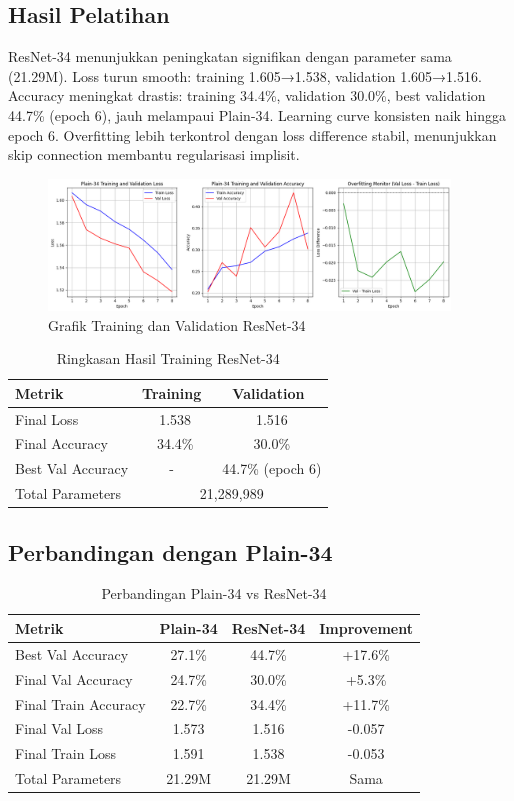 \documentclass[11pt,a4paper]{article}
\begin{document}
\subsection{Hasil Pelatihan}
ResNet-34 menunjukkan peningkatan signifikan dengan parameter sama (21.29M). Loss turun smooth: training 1.605→1.538, validation 1.605→1.516. Accuracy meningkat drastis: training 34.4\%, validation 30.0\%, best validation 44.7\% (epoch 6), jauh melampaui Plain-34. Learning curve konsisten naik hingga epoch 6. Overfitting lebih terkontrol dengan loss difference stabil, menunjukkan skip connection membantu regularisasi implisit.
\begin{figure}[h]
\centering
\includegraphics[width=0.95\textwidth]{Figure/resnet34.png}
\caption{Grafik Training dan Validation ResNet-34}
\label{fig:resnet34}
\end{figure}
\begin{table}[h]
\centering
\caption{Ringkasan Hasil Training ResNet-34}
\begin{tabular}{|l|c|c|}
\hline
\textbf{Metrik} & \textbf{Training} & \textbf{Validation} \\ \hline
Final Loss & ~1.538 & ~1.516 \\ \hline
Final Accuracy & ~34.4\% & ~30.0\% \\ \hline
Best Val Accuracy & - & ~44.7\% (epoch 6) \\ \hline
Total Parameters & \multicolumn{2}{c|}{21,289,989} \\ \hline
\end{tabular}
\end{table}
\subsection{Perbandingan dengan Plain-34}
\begin{table}[h]
\centering
\caption{Perbandingan Plain-34 vs ResNet-34}
\begin{tabular}{|l|c|c|c|}
\hline
\textbf{Metrik} & \textbf{Plain-34} & \textbf{ResNet-34} & \textbf{Improvement} \\ \hline
Best Val Accuracy & 27.1\% & 44.7\% & +17.6\% \\ \hline
Final Val Accuracy & 24.7\% & 30.0\% & +5.3\% \\ \hline
Final Train Accuracy & 22.7\% & 34.4\% & +11.7\% \\ \hline
Final Val Loss & 1.573 & 1.516 & -0.057 \\ \hline
Final Train Loss & 1.591 & 1.538 & -0.053 \\ \hline
Total Parameters & 21.29M & 21.29M & Sama \\ \hline
\end{tabular}
\end{table}
\end{document}
